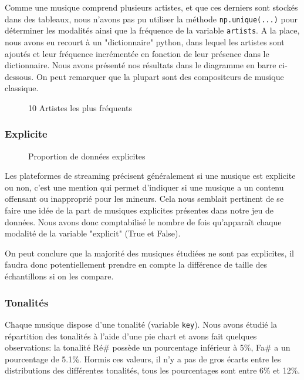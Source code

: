 \documentclass[a4paper, 12pt]{report}
\newcommand{\pythoninline}[1]{\texttt{#1}}
\begin{document}
Comme une musique comprend plusieurs artistes, et que ces derniers sont stockés dans des tableaux, nous n'avons pas pu utiliser la méthode \pythoninline{np.unique(...)} pour déterminer les modalités ainsi que la fréquence de la variable \verb|artists|. A la place, nous avons eu recourt à un "dictionnaire" python, dans lequel les artistes sont ajoutés et leur fréquence incrémentée en fonction de leur présence dans le dictionnaire. Nous avons présenté nos résultats dans le diagramme en barre ci-dessous. On peut remarquer que la plupart sont des compositeurs de musique classique.

 \begin{figure}[h]
     \centering
     
     \caption{10 Artistes les plus fréquents}
 \end{figure}

\subsubsection{Explicite}
\begin{figure}[!h]
    \centering

    \caption{Proportion de données explicites}
\end{figure} 


Les plateformes de streaming précisent généralement si une musique est explicite ou non, c'est une mention qui permet d'indiquer si une musique a un contenu offensant ou inapproprié pour les mineurs. Cela nous semblait pertinent de se faire une idée de la part de musiques explicites présentes dans notre jeu de données. Nous avons donc comptabilisé le nombre de fois qu'apparaît chaque modalité de la variable "explicit" (True et False). 


On peut conclure que la majorité des musiques étudiées ne sont pas explicites, il faudra donc potentiellement prendre en compte la différence de taille des échantillons si on les compare.


\subsubsection{Tonalités}

Chaque musique dispose d'une tonalité (variable \verb|key|). Nous avons étudié la répartition des tonalités à l'aide d'une pie chart et avons fait quelques observations: la tonalité Ré\# possède un pourcentage inférieur à 5\%, Fa\# a un pourcentage de 5.1\%. Hormis ces valeurs, il n'y a pas de gros écarts entre les distributions des différentes tonalités, tous les pourcentages sont entre 6\% et 12\%.
\end{document}
